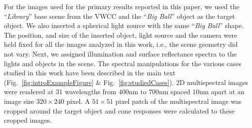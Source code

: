 \documentclass{jov}
\begin{document}
For the images used for the primary results reported in this paper, we used the ``{\it Library}'' base scene from the VWCC  and the ``{\it Big Ball}'' object as the target object. We also inserted a spherical light source with the same ``{\it Big Ball}'' shape. The position, and size of the inserted object, light source and the camera were held fixed for all the images analyzed in this work, i.e., the scene geometry did not vary. Next, we assigned illumination and surface reflectance spectra to the lights and objects in the scene. The spectral manipulations for the various cases studied in this work have been described in the main text (Fig.~\ref{fig:introExampleFigure} \& Fig.~\ref{fig:studiedCases}). 2D multispectral images were rendered at 31 wavelengths from $400$nm to $700$nm spaced $10$nm apart at an image size $320\times 240$ pixel. A $51 \times 51$ pixel patch of the multispectral image was cropped around the target object and cone responses were calculated to these cropped images. 
\end{document}

